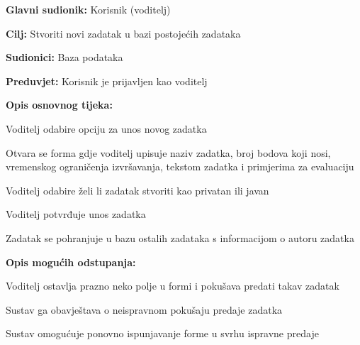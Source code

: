 										
										
					\noindent {}
					\begin{packed_item}
						
						\item \textbf{Glavni sudionik: }Korisnik (voditelj)
						\item \textbf{Cilj:} Stvoriti novi zadatak u bazi postojećih zadataka
						\item \textbf{Sudionici:} Baza podataka
						\item \textbf{Preduvjet:} Korisnik je prijavljen kao voditelj
						\item \textbf{Opis osnovnog tijeka:}
						
						\item[] \begin{packed_enum}
							\item Voditelj odabire opciju za unos novog zadatka
							\item Otvara se forma gdje voditelj upisuje naziv zadatka, broj bodova koji nosi, vremenskog ograničenja izvršavanja, tekstom zadatka i primjerima za evaluaciju
							\item Voditelj odabire želi li zadatak stvoriti kao privatan ili javan
							\item Voditelj potvrđuje unos zadatka
							\item Zadatak se pohranjuje u bazu ostalih zadataka s informacijom o autoru zadatka
						\end{packed_enum}
						
						\item  \textbf{Opis mogućih odstupanja:}
						\item[] \begin{packed_item}
							
							\item[2.a] Voditelj ostavlja prazno neko polje u formi i pokušava predati takav zadatak
							\item[] \begin{packed_enum}
								
								\item Sustav ga obavještava o neispravnom pokušaju predaje zadatka 
								\item Sustav omogućuje ponovno ispunjavanje forme u svrhu ispravne predaje
								
							\end{packed_enum}
						\end{packed_item}
					\end{packed_item}
					
